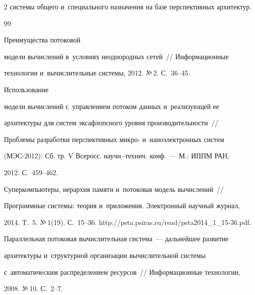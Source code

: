 \begin{multicols}{2}
системы общего и~специального назначения на базе перспективных архитектур.

  

{\small\frenchspacing

 {%


 \begin{thebibliography}{99}


   Преимущества потоковой 

модели вычислений в~условиях неоднородных сетей~// Информационные 

технологии и~вычислительные системы, 2012. №\,2. С.~36--45.


   Использование 

модели вычислений с~управлением потоком данных и~реализующей ее 

архитектуры для сис\-тем эксафлопсного уровня производительности~// 

Проблемы разработки перспективных микро- и~наноэлектронных сис\-тем 

(МЭС-2012): Сб. тр. V Всеросс. научн.-технич. конф.~--- М.: ИППМ РАН, 

2012. С.~459--462.



Суперкомпьютеры, иерархия памяти и~потоковая модель вычислений~// 

Программные системы: теория и~приложения. Электронный научный журнал, 

2014. T.~5. №\,1(19). С.~15--36. {\sf http://psta.psiras.ru/read/psta2014\_1\_15-36.pdf}.



Параллельная потоковая вычислительная система~--- дальнейшее развитие 

архитектуры и~структурной организации вычислительной системы 

с~автоматическим распределением ресурсов~// Информационные технологии, 

2008. №\,10. С.~2--7.


\end{thebibliography}}}
\end{multicols}
